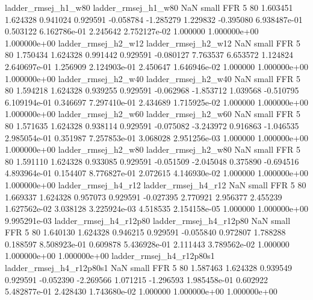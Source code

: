      ladder_rmsej_h1_w80      ladder_rmsej_h1_w80                   NaN      small      FFR                 5 80 1.603451       1.624328 0.941024       0.929591   -0.058784     -1.285279      1.229832    -0.395080   6.938487e-01  0.503122 6.162786e-01     2.245642   2.752127e-02            1.000000    1.000000e+00        1.000000e+00
     ladder_rmsej_h2_w12      ladder_rmsej_h2_w12                   NaN      small      FFR                 5 80 1.750434       1.624328 0.991442       0.929591   -0.080127      7.763537      6.653572     1.124824   2.640697e-01  1.256909 2.124903e-01     2.450647   1.646946e-02            1.000000    1.000000e+00        1.000000e+00
     ladder_rmsej_h2_w40      ladder_rmsej_h2_w40                   NaN      small      FFR                 5 80 1.594218       1.624328 0.939255       0.929591   -0.062968     -1.853712      1.039568    -0.510795   6.109194e-01  0.346697 7.297410e-01     2.434689   1.715925e-02            1.000000    1.000000e+00        1.000000e+00
     ladder_rmsej_h2_w60      ladder_rmsej_h2_w60                   NaN      small      FFR                 5 80 1.571635       1.624328 0.938114       0.929591   -0.075082     -3.243972      0.916863    -1.046535   2.985054e-01  0.351987 7.257853e-01     3.068028   2.951256e-03            1.000000    1.000000e+00        1.000000e+00
     ladder_rmsej_h2_w80      ladder_rmsej_h2_w80                   NaN      small      FFR                 5 80 1.591110       1.624328 0.933085       0.929591   -0.051509     -2.045048      0.375890    -0.694516   4.893964e-01  0.154407 8.776827e-01     2.072615   4.146930e-02            1.000000    1.000000e+00        1.000000e+00
     ladder_rmsej_h4_r12      ladder_rmsej_h4_r12                   NaN      small      FFR                 5 80 1.669337       1.624328 0.957073       0.929591   -0.027395      2.770921      2.956377     2.455239   1.627562e-02  3.038128 3.225924e-03     4.518535   2.154158e-05            1.000000    1.000000e+00        9.995291e-03
  ladder_rmsej_h4_r12p80   ladder_rmsej_h4_r12p80                   NaN      small      FFR                 5 80 1.640130       1.624328 0.946215       0.929591   -0.055840      0.972807      1.788288     0.188597   8.508923e-01  0.609878 5.436928e-01     2.111443   3.789562e-02            1.000000    1.000000e+00        1.000000e+00
ladder_rmsej_h4_r12p80s1 ladder_rmsej_h4_r12p80s1                   NaN      small      FFR                 5 80 1.587463       1.624328 0.939549       0.929591   -0.052390     -2.269566      1.071215    -1.296593   1.985458e-01  0.602922 5.482877e-01     2.428430   1.743680e-02            1.000000    1.000000e+00        1.000000e+00
